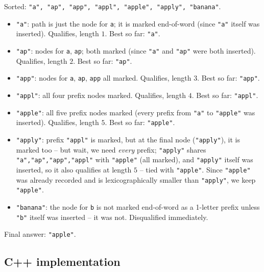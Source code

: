 Sorted: \texttt{"a", "ap", "app", "appl", "apple", "apply", "banana"}.

\begin{itemize}
  \item \texttt{"a"}: path is just the node for \texttt{a}; it is marked
        end-of-word (since \texttt{"a"} itself was inserted). Qualifies,
        length $1$. Best so far: \texttt{"a"}.
  \item \texttt{"ap"}: nodes for \texttt{a}, \texttt{ap}; both marked
        (since \texttt{"a"} and \texttt{"ap"} were both inserted).
        Qualifies, length $2$. Best so far: \texttt{"ap"}.
  \item \texttt{"app"}: nodes for \texttt{a}, \texttt{ap}, \texttt{app}
        all marked. Qualifies, length $3$. Best so far: \texttt{"app"}.
  \item \texttt{"appl"}: all four prefix nodes marked. Qualifies, length
        $4$. Best so far: \texttt{"appl"}.
  \item \texttt{"apple"}: all five prefix nodes marked (every prefix
        from \texttt{"a"} to \texttt{"apple"} was inserted). Qualifies,
        length $5$. Best so far: \texttt{"apple"}.
  \item \texttt{"apply"}: prefix \texttt{"appl"} is marked, but at the
        final node (\texttt{"apply"}), it is marked too -- but wait, we
        need \emph{every} prefix; \texttt{"apply"} shares
        \texttt{"a","ap","app","appl"} with \texttt{"apple"} (all
        marked), and \texttt{"apply"} itself was inserted, so it also
        qualifies at length $5$ -- tied with \texttt{"apple"}. Since
        \texttt{"apple"} was already recorded and is lexicographically
        smaller than \texttt{"apply"}, we keep \texttt{"apple"}.
  \item \texttt{"banana"}: the node for \texttt{b} is not marked
        end-of-word as a 1-letter prefix unless \texttt{"b"} itself was
        inserted -- it was not. Disqualified immediately.
\end{itemize}

Final answer: \texttt{"apple"}.

\subsection*{C++ implementation}

